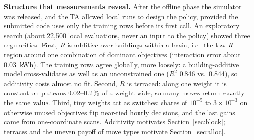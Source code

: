 \textbf{Structure that measurements reveal.} After the offline phase the simulator was released, and the TA allowed
local runs to design the policy, provided the submitted code uses only the training rows before its first call. An
exploratory search (about 22,500 local evaluations, never an input to the policy) showed three regularities. First,
$R$ is additive over buildings within a basin, i.e.\ the low-$R$ region around one combination of dominant objectives
(interaction error about 0.03~kWh). The training rows agree globally, more loosely: a building-additive model
cross-validates as well as an unconstrained one ($R^2$ 0.846 vs.\ 0.844), so additivity costs almost no fit. Second, $R$ is
terraced: along one weight it is constant on plateaus 0.02--0.2\,\% of a weight wide, so many moves return exactly
the same value. Third, tiny weights act as switches: shares of $10^{-5}$ to $3\times10^{-3}$ on otherwise unused
objectives flip near-tied hourly decisions, and the last gains came from one-coordinate scans. Additivity motivates
Section~\ref{sec:block}; terraces and the uneven payoff of move types motivate Section~\ref{sec:alloc}.
